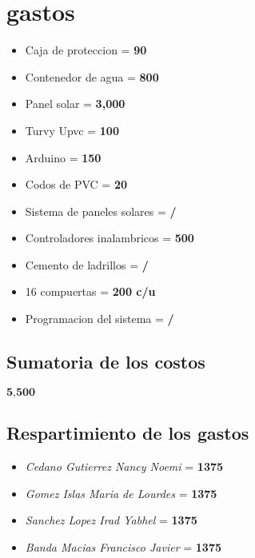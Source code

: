 \documentclass[11pt,a4paper]{article}
\begin{document}
\section{gastos}
\begin{itemize}
\item  Caja  de  proteccion = \textbf{90}
\item  Contenedor de agua = \textbf{800 }
\item  Panel solar = \textbf{3,000}
\item  Turvy Upvc = \textbf{100} 
\item  Arduino = \textbf{150} 
\item  Codos de PVC = \textbf{20} 
\item  Sistema de paneles solares = \textbf{/} 
\item  Controladores inalambricos = \textbf{500} 
\item  Cemento de ladrillos = \textbf{ / }
\item  16 compuertas = \textbf{200 c/u }
\item  Programacion del sistema = \textbf{/} 
\end{itemize}

\subsection{Sumatoria de los costos }
$ \textbf{5,500} $

\subsection{Respartimiento de los gastos}
\begin{itemize}
\item \emph{Cedano Gutierrez Nancy Noemi} = \textbf{1375}
\item \emph{Gomez Islas Maria de Lourdes} = \textbf{1375}
\item \emph{Sanchez Lopez Irad Yabhel} = \textbf{1375}
\item \emph{Banda Macias Francisco Javier} = \textbf{1375}
\end{itemize}
\end{document}
